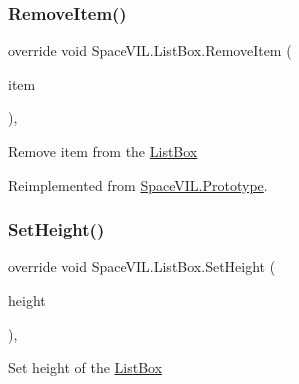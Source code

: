 \mbox{\label{class_space_v_i_l_1_1_list_box_a3fac47d275899619c3f705c24816ff87}} 
\subsubsection{\texorpdfstring{Remove\+Item()}{RemoveItem()}}
{\footnotesize\ttfamily override void Space\+V\+I\+L.\+List\+Box.\+Remove\+Item (\begin{DoxyParamCaption}\item[{\mbox{\hyperlink{interface_space_v_i_l_1_1_core_1_1_i_base_item}{I\+Base\+Item}}}]{item }\end{DoxyParamCaption})\hspace{0.3cm}{\ttfamily [inline]}, {\ttfamily [virtual]}}



Remove item from the \mbox{\hyperlink{class_space_v_i_l_1_1_list_box}{List\+Box}} 



Reimplemented from \mbox{\hyperlink{class_space_v_i_l_1_1_prototype_a7a2aabccfe6389f71d0265fa73f0ae87}{Space\+V\+I\+L.\+Prototype}}.

\mbox{\label{class_space_v_i_l_1_1_list_box_a5b44bd011e83b56053b529cf55253296}} 
\subsubsection{\texorpdfstring{Set\+Height()}{SetHeight()}}
{\footnotesize\ttfamily override void Space\+V\+I\+L.\+List\+Box.\+Set\+Height (\begin{DoxyParamCaption}\item[{int}]{height }\end{DoxyParamCaption})\hspace{0.3cm}{\ttfamily [inline]}, {\ttfamily [virtual]}}



Set height of the \mbox{\hyperlink{class_space_v_i_l_1_1_list_box}{List\+Box}} 




